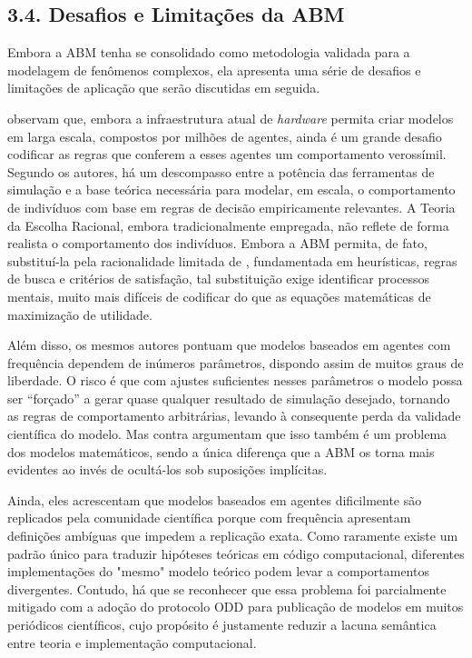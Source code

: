 \documentclass[12pt,oneside,a4paper,brazil,sumario=tradicional]{abntex2}
\begin{document}
\subsection*{3.4. Desafios e Limitações da ABM}
Embora a ABM tenha se consolidado como metodologia validada para a modelagem de fenômenos complexos, ela apresenta uma série de desafios e limitações de aplicação que serão discutidas em seguida.

 observam que, embora a infraestrutura atual de \textit{hardware} permita criar modelos em larga escala, compostos por milhões de agentes, ainda é um grande desafio codificar as regras que conferem a esses agentes um comportamento verossímil. Segundo os autores, há um descompasso entre a potência das ferramentas de simulação e a base teórica necessária para modelar, em escala, o comportamento de indivíduos com base em regras de decisão empiricamente relevantes. A Teoria da Escolha Racional, embora tradicionalmente empregada, não reflete de forma realista o comportamento dos indivíduos. Embora a ABM permita, de fato, substituí-la pela racionalidade limitada de , fundamentada em heurísticas, regras de busca e critérios de satisfação, tal substituição exige identificar processos mentais, muito mais difíceis de codificar do que as equações matemáticas de maximização de utilidade.

Além disso, os mesmos autores pontuam que modelos baseados em agentes com frequência dependem de inúmeros parâmetros, dispondo assim de muitos graus de liberdade. O risco é que com ajustes suficientes nesses parâmetros o modelo possa ser “forçado” a gerar quase qualquer resultado de simulação desejado, tornando as regras de comportamento arbitrárias, levando à consequente perda da validade científica do modelo. Mas  contra argumentam que isso também é um problema dos modelos matemáticos, sendo a única diferença que a ABM os torna mais evidentes ao invés de ocultá-los sob suposições implícitas.

Ainda, eles acrescentam que modelos baseados em agentes dificilmente são replicados pela comunidade científica porque com frequência apresentam definições ambíguas que impedem a replicação exata. Como raramente existe um padrão único para traduzir hipóteses teóricas em código computacional, diferentes implementações do "mesmo" modelo teórico podem levar a comportamentos divergentes. Contudo, há que se reconhecer que essa problema foi parcialmente mitigado com a adoção do protocolo ODD \cite{grimm2006} para publicação de modelos em muitos periódicos científicos, cujo propósito é justamente reduzir a lacuna semântica entre teoria e implementação computacional.
\end{document}

